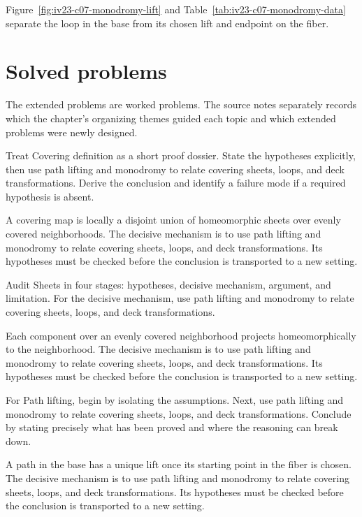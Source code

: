 Figure~\ref{fig:iv23-c07-monodromy-lift} and Table~\ref{tab:iv23-c07-monodromy-data}
separate the loop in the base from its chosen lift and endpoint on the fiber.


\section{Solved problems}
The extended problems are worked problems. The source notes separately records which the chapter's organizing themes guided each topic and which extended problems were newly designed.

\begin{problem}\label{prob:iv23-problem-01}
Treat Covering definition as a short proof dossier. State the hypotheses explicitly, then use path lifting and monodromy to relate covering sheets, loops, and deck transformations. Derive the conclusion and identify a failure mode if a required hypothesis is absent.
\end{problem}
\begin{solution}
A covering map is locally a disjoint union of homeomorphic sheets over evenly covered neighborhoods. The decisive mechanism is to use path lifting and monodromy to relate covering sheets, loops, and deck transformations. Its hypotheses must be checked before the conclusion is transported to a new setting.
\end{solution}

\begin{problem}\label{prob:iv23-problem-02}
Audit Sheets in four stages: hypotheses, decisive mechanism, argument, and limitation. For the decisive mechanism, use path lifting and monodromy to relate covering sheets, loops, and deck transformations.
\end{problem}
\begin{solution}
Each component over an evenly covered neighborhood projects homeomorphically to the neighborhood. The decisive mechanism is to use path lifting and monodromy to relate covering sheets, loops, and deck transformations. Its hypotheses must be checked before the conclusion is transported to a new setting.
\end{solution}

\begin{problem}\label{prob:iv23-problem-03}
For Path lifting, begin by isolating the assumptions. Next, use path lifting and monodromy to relate covering sheets, loops, and deck transformations. Conclude by stating precisely what has been proved and where the reasoning can break down.
\end{problem}
\begin{solution}
A path in the base has a unique lift once its starting point in the fiber is chosen. The decisive mechanism is to use path lifting and monodromy to relate covering sheets, loops, and deck transformations. Its hypotheses must be checked before the conclusion is transported to a new setting.
\end{solution}

